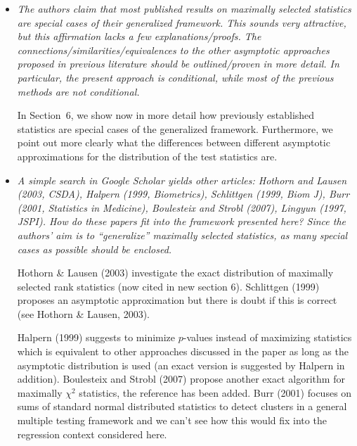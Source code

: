 \documentclass[11pt,a4paper]{article}
\begin{document}
\begin{itemize}

  \item \textit{The authors claim that most published results on maximally selected
        statistics are special cases of their generalized framework. This sounds very
	attractive, but this affirmation lacks a few explanations/proofs. The
        connections/similarities/equivalences to the other asymptotic approaches
        proposed in previous literature should be outlined/proven in more detail. In
        particular, the present approach is conditional, while most of the previous
        methods are not conditional.}
	
	In Section~6, we show now in more detail how previously established statistics
	are special cases of the generalized framework. Furthermore, we point out 
	more clearly what the differences between different asymptotic approximations
	for the distribution of the test statistics are.
	
  \item \textit{A simple search in Google Scholar yields other articles: Hothorn and
        Lausen (2003, CSDA), Halpern (1999, Biometrics), Schlittgen (1999, Biom J),
	Burr (2001, Statistics in Medicine), Boulesteix and Strobl (2007),
	Lingyun (1997, JSPI). How do these papers fit into the framework presented here?
	Since the authors' aim is to ``generalize'' maximally selected statistics, as
	many special cases as possible should be enclosed.}
	
        Hothorn \& Lausen (2003) investigate the exact distribution of maximally
        selected rank statistics (now cited in new section 6). Schlittgen (1999)
        proposes an asymptotic approximation but there is doubt if this
        is correct (see Hothorn \& Lausen, 2003). 

        Halpern (1999) suggests to minimize $p$-values instead of maximizing 
        statistics which is equivalent to other approaches discussed in the paper 
        as long as the asymptotic distribution is used (an exact version is suggested 
        by Halpern in addition).
        Boulesteix and Strobl (2007) propose another exact algorithm for maximally
        $\chi^2$ statistics, the reference has been added.
        Burr (2001) focuses on sums of standard normal distributed statistics
        to detect clusters in a general multiple testing framework 
        and we can't see how this would fix into 
        the regression context considered here.
	

\end{itemize}
\end{document}
